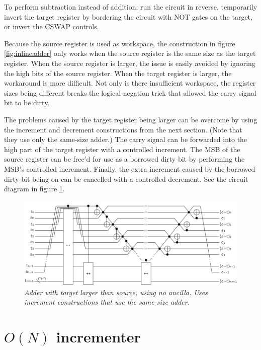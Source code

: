\documentclass[twocolumn]{article}
\begin{document}
To perform subtraction instead of addition: run the circuit in reverse, temporarily invert the target register by bordering the circuit with NOT gates on the target, or invert the CSWAP controls.

Because the source register is used as workspace, the construction in figure \ref{fig:inlineadder} only works when the source register is the same size as the target register.
When the source register is larger, the issue is easily avoided by ignoring the high bits of the source register.
When the target register is larger, the workaround is more difficult.
Not only is there insufficient workspace, the register sizes being different breaks the logical-negation trick that allowed the carry signal bit to be dirty.

The problems caused by the target register being larger can be overcome by using the increment and decrement constructions from the next section.
(Note that they use only the same-size adder.)
The carry signal can be forwarded into the high part of the target register with a controlled increment.
The MSB of the source register can be free'd for use as a borrowed dirty bit by performing the MSB's controlled increment.
Finally, the extra increment caused by the borrowed dirty bit being on can be cancelled with a controlled decrement.
See the circuit diagram in figure \ref{fig:inline-adder-into-large}.

\begin{figure}
  \centering
  \includegraphics[totalheight=3cm]{inline-adder-into-large.png}
  \caption{\em
      Adder with target larger than source, using no ancilla.
      Uses increment constructions that use the same-size adder.}
  \label{fig:inline-adder-into-large}
\end{figure}

\section{$O(N)$ incrementer}
\end{document}
